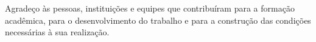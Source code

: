 
Agradeço às pessoas, instituições e equipes que contribuíram para a formação acadêmica, para o desenvolvimento do trabalho e para a construção das condições necessárias à sua realização.
